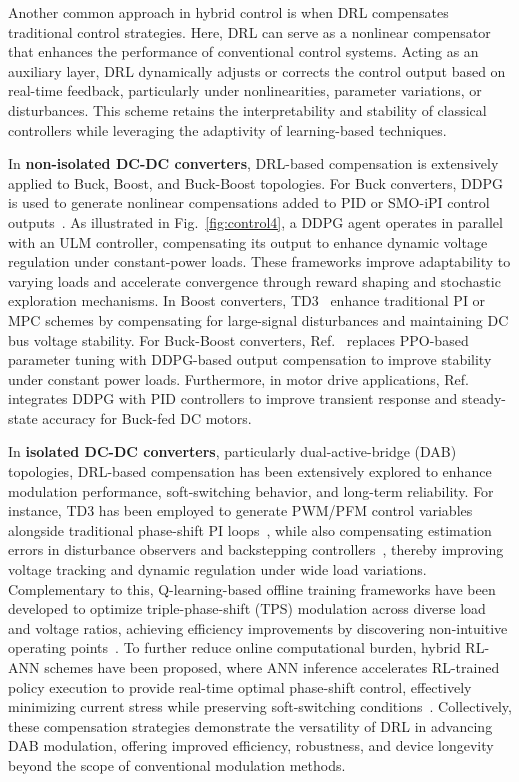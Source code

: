 Another common approach in hybrid control is when DRL compensates traditional control strategies. Here, DRL can serve as a nonlinear compensator that enhances the performance of conventional control systems. Acting as an auxiliary layer, DRL dynamically adjusts or corrects the control output based on real-time feedback, particularly under nonlinearities, parameter variations, or disturbances. This scheme retains the interpretability and stability of classical controllers while leveraging the adaptivity of learning-based techniques.

In \textbf{non-isolated DC-DC converters}, DRL-based compensation is extensively applied to Buck, Boost, and Buck-Boost topologies. For Buck converters, DDPG is used to generate nonlinear compensations added to PID or SMO-iPI control outputs~\cite{hu2021novel,gheisarnejad2020novel}. As illustrated in Fig.~\ref{fig:control4}, a DDPG agent operates in parallel with an ULM controller, compensating its output to enhance dynamic voltage regulation under constant-power loads. These frameworks improve adaptability to varying loads and accelerate convergence through reward shaping and stochastic exploration mechanisms. In Boost converters, TD3~\cite{nicola2023improved} enhance traditional PI or MPC schemes by compensating for large-signal disturbances and maintaining DC bus voltage stability. For Buck-Boost converters, Ref.~\cite{gheisarnejad2020novel} replaces PPO-based parameter tuning with DDPG-based output compensation to improve stability under constant power loads. Furthermore, in motor drive applications, Ref.~\cite{lu2021speed} integrates DDPG with PID controllers to improve transient response and steady-state accuracy for Buck-fed DC motors.

In \textbf{isolated DC-DC converters}, particularly dual-active-bridge (DAB) topologies, DRL-based compensation has been extensively explored to enhance modulation performance, soft-switching behavior, and long-term reliability. For instance, TD3 has been employed to generate PWM/PFM control variables alongside traditional phase-shift PI loops~\cite{lee2023pwm}, while also compensating estimation errors in disturbance observers and backstepping controllers~\cite{meng2022novel}, thereby improving voltage tracking and dynamic regulation under wide load variations. Complementary to this, Q-learning-based offline training frameworks have been developed to optimize triple-phase-shift (TPS) modulation across diverse load and voltage ratios, achieving efficiency improvements by discovering non-intuitive operating points~\cite{chou2019maximum}. To further reduce online computational burden, hybrid RL-ANN schemes have been proposed, where ANN inference accelerates RL-trained policy execution to provide real-time optimal phase-shift control, effectively minimizing current stress while preserving soft-switching conditions~\cite{tang2021rl}. Collectively, these compensation strategies demonstrate the versatility of DRL in advancing DAB modulation, offering improved efficiency, robustness, and device longevity beyond the scope of conventional modulation methods.


